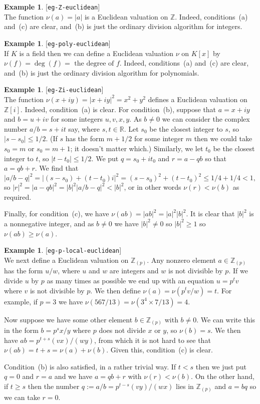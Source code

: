 \documentclass{amsart}
\newcommand{\lbl}[1]{\label{#1}\textup{[\texttt{#1}]}\ \\}
\newcommand{\lbl}{\label}
\newcommand{\R}         {{\mathbb{R}}}
\newcommand{\Z}         {{\mathbb{Z}}}
\newcommand{\Zpl}       {{\mathbb{Z}_{(p)}}}
\newcommand{\tm}        {\times}
\renewcommand{\:}{\colon}
\theoremstyle{definition}
\newtheorem{example}[theorem]{Example}
\begin{document}
\begin{example}\lbl{eg-Z-euclidean}
 The function $\nu(a)=|a|$ is a Euclidean valuation on $\Z$.  Indeed,
 conditions~(a) and~(c) are clear, and~(b) is just the ordinary
 division algorithm for integers.
\end{example}
\begin{example}\lbl{eg-poly-euclidean}
 If $K$ is a field then we can define a Euclidean valuation $\nu$ on
 $K[x]$ by $\nu(f)=\deg(f)=\text{ the degree of } f$.  Indeed,
 conditions~(a) and~(c) are clear, and~(b) is just the ordinary
 division algorithm for polynomials.
\end{example}
\begin{example}\lbl{eg-Zi-euclidean}
 The function $\nu(x+iy)=|x+iy|^2=x^2+y^2$ defines a Euclidean
 valuation on $\Z[i]$.  Indeed, condition~(a) is clear.  For
 condition~(b), suppose that $a=x+iy$ and $b=u+iv$ for some integers
 $u,v,x,y$.  As $b\neq 0$ we can consider the complex number
 $a/b=s+it$ say, where $s,t\in\R$.  Let $s_0$ be the closest integer
 to $s$, so $|s-s_0|\leq 1/2$.  (If $s$ has the form $m+1/2$ for some
 integer $m$ then we could take $s_0=m$ or $s_0=m+1$; it doesn't
 matter which.)  Similarly, we let $t_0$ be the closest integer to
 $t$, so $|t-t_0|\leq 1/2$.  We put $q=s_0+it_0$ and $r=a-qb$ so that
 $a=qb+r$.  We find that
 \[ |a/b-q|^2 = |(s-s_0)+(t-t_0)i|^2 = 
     (s-s_0)^2 + (t-t_0)^2 \leq 1/4 + 1/4 < 1, 
 \]
 so $|r|^2=|a-qb|^2=|b|^2|a/b-q|^2<|b|^2$, or in other words
 $\nu(r)<\nu(b)$ as required.

 Finally, for condition~(c), we have $\nu(ab)=|ab|^2=|a|^2|b|^2$.  It
 is clear that $|b|^2$ is a nonnegative integer, and as $b\neq 0$ we
 have $|b|^2\neq 0$ so $|b|^2\geq 1$ so $\nu(ab)\geq\nu(a)$.
\end{example}
\begin{example}\lbl{eg-p-local-euclidean}
 We next define a Euclidean valuation on $\Zpl$.  Any nonzero element
 $a\in\Zpl$ has the form $u/w$, where $u$ and $w$ are integers and $w$
 is not divisible by $p$.  If we divide $u$ by $p$ as many times as
 possible we end up with an equation $u=p^tv$ where $v$ is not
 divisible by $p$.  We then define $\nu(a)=\nu(p^tv/w)=t$.  For
 example, if $p=3$ we have $\nu(567/13)=\nu(3^4\tm 7/13)=4$.

 Now suppose we have some other element $b\in\Zpl$ with $b\neq 0$.
 We can write this in the form $b=p^sx/y$ where $p$ does not
 divide $x$ or $y$, so $\nu(b)=s$.  We then have
 $ab=p^{t+s}(vx)/(wy)$, from which it is not hard to see that
 $\nu(ab)=t+s=\nu(a)+\nu(b)$.  Given this, condition~(c) is clear.

 Condition~(b) is also satisfied, in a rather trivial way.  If $t<s$
 then we just put $q=0$ and $r=a$ and we have $a=qb+r$ with
 $\nu(r)<\nu(b)$.  On the other hand, if $t\geq s$ then the number
 $q:=a/b=p^{t-s}(vy)/(wx)$ lies in $\Zpl$ and $a=bq$ so we can take
 $r=0$. 
\end{example}
\end{document}
